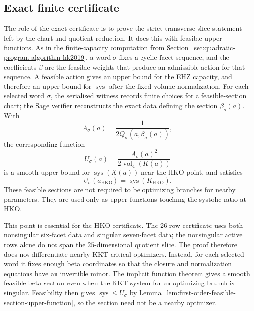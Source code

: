 \subsection{Exact finite certificate}
\label{subsec:hko-local-maximum-computation-with-sagemath}

The role of the exact certificate is to prove the strict transverse-slice
statement left by the chart and quotient reduction. It does this with feasible
upper functions. As in the finite-capacity computation from
Section~\ref{sec:quadratic-program-algorithm-hk2019}, a word \(\sigma\) fixes
a cyclic facet sequence, and the coefficients \(\beta\) are the feasible
weights that produce an admissible action for that sequence. A feasible action
gives an upper bound for the EHZ capacity, and therefore an upper bound for
\(\operatorname{sys}\) after the fixed volume normalization. For each selected
word \(\sigma\), the serialized witness records finite choices for a
feasible-section chart; the Sage verifier reconstructs the exact data defining
the section \(\beta_\sigma(a)\). With
\[
  A_\sigma(a)=\frac{1}{2Q_\sigma(a,\beta_\sigma(a))},
\]
the corresponding function
\[
  U_\sigma(a)=\frac{A_\sigma(a)^2}{2\operatorname{vol}_4(K(a))}
\]
is a smooth upper bound for \(\operatorname{sys}(K(a))\) near the HKO point,
and satisfies
\[
  U_\sigma(a_{\mathrm{HKO}})
  =
  \operatorname{sys}(K_{\mathrm{HKO}}).
\]
These feasible sections are not required to be optimizing branches for nearby
parameters. They are used only as upper functions touching the systolic ratio
at HKO.

This point is essential for the HKO certificate. The 26-row certificate uses
both nonsingular six-facet data and singular seven-facet data; the
nonsingular active rows alone do not span the \(25\)-dimensional quotient
slice. The proof therefore does not differentiate nearby KKT-critical
optimizers. Instead, for each selected word it fixes enough beta coordinates
so that the closure and normalization equations have an invertible minor. The
implicit function theorem gives a smooth feasible beta section even when the
KKT system for an optimizing branch is singular.  Feasibility then gives
\(\operatorname{sys}\leq U_\sigma\) by
Lemma~\ref{lem:first-order-feasible-section-upper-function}, so the section
need not be a nearby optimizer.

